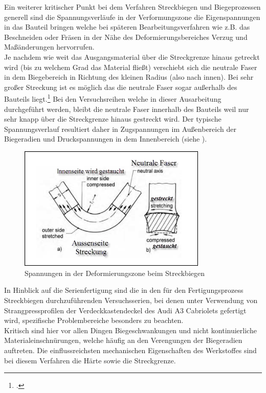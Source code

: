 \documentclass[12pt,a4paper,parskip]{scrartcl}
\begin{document}
Ein weiterer kritischer Punkt bei dem Verfahren Streckbiegen und Biegeprozessen generell sind die Spannungsverläufe in der Verformungszone die Eigenspannungen in das Bauteil bringen welche bei späteren Bearbeitungsverfahren wie z.B. das Beschneiden oder Fräsen in der Nähe des Deformierungsbereiches Verzug und Maßänderungen hervorrufen.\\ Je nachdem wie weit das Ausgangsmaterial über die Streckgrenze hinaus getreckt wird (bis zu welchem Grad das Material fließt) verschiebt sich die neutrale Faser in dem Biegebereich in Richtung des kleinen Radius (also nach innen). Bei sehr großer Streckung ist es möglich das die neutrale Faser sogar außerhalb des Bauteils liegt.\footcite[Vgl.][374]{fu} Bei den Versuchsreihen welche in dieser Ausarbeitung durchgeführt werden, bleibt die neutrale Faser innerhalb des Bauteils weil nur sehr knapp über die Streckgrenze hinaus gestreckt wird. Der typische Spannungsverlauf resultiert daher in Zugspannungen im Außenbereich der Biegeradien und Druckspannungen in dem Innenbereich (siehe ).

\begin{figure}[hbtp]
\centering
\includegraphics[width=0.8\textwidth]{neutralefaser}
\caption[Spannungen in der Umformzone beim Streckbiegen]{Spannungen in der Deformierungszone beim Streckbiegen\protect\footnotemark}
\label{fig:neutralefaser}
\end{figure}


In Hinblick auf die Serienfertigung sind die in den für den Fertigungsprozess  Streckbiegen durchzuführenden Versuchsserien, bei denen unter Verwendung von Strangpressprofilen der Verdeckkastendeckel des Audi A3 Cabriolets gefertigt wird, spezifische Problembereiche besonders zu beachten.\\
Kritisch sind hier vor allen Dingen Biegeschwankungen und nicht kontinuierliche Materialeinschnürungen,  welche häufig an den Verengungen der Biegeradien auftreten. Die einflussreichsten mechanischen Eigenschaften des Werkstoffes sind bei diesem Verfahren die Härte sowie die Streckgrenze.
\end{document}
